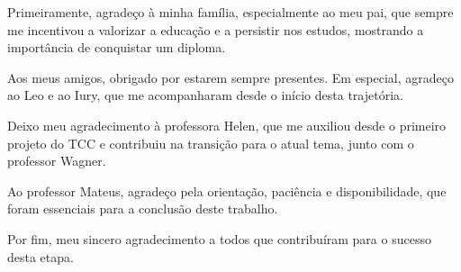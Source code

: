 \begin{agradecimentos}

Primeiramente, agradeço à minha família, especialmente ao meu pai, que sempre me incentivou a valorizar a educação e a persistir nos estudos, mostrando a importância de conquistar um diploma.

Aos meus amigos, obrigado por estarem sempre presentes. Em especial, agradeço ao Leo e ao Iury, que me acompanharam desde o início desta trajetória.

Deixo meu agradecimento à professora Helen, que me auxiliou desde o primeiro projeto do TCC e contribuiu na transição para o atual tema, junto com o professor Wagner.

Ao professor Mateus, agradeço pela orientação, paciência e disponibilidade, que foram essenciais para a conclusão deste trabalho.

Por fim, meu sincero agradecimento a todos que contribuíram para o sucesso desta etapa.


\end{agradecimentos}